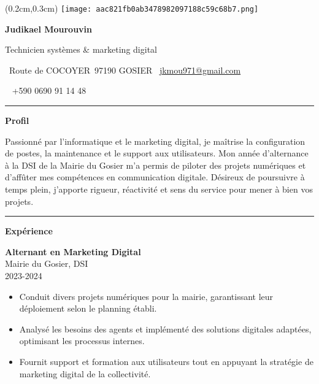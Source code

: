 \documentclass[a4paper]{article}
\renewcommand{\colorbox}[2]{#2}%
\newcommand{\fullrule}{\hspace{-1.5cm}\rule{\paperwidth}{0.4pt}}
\newcommand{\cvsection}[1]{%
  \vspace{6pt}\textbf{\Large #1}\par\vspace{2pt}}
\begin{document}
\color{white}
\begin{textblock*}{4cm}(0.2cm,0.3cm)
  \texttt{[image: aac821fb0ab3478982097188c59c68b7.png]}
\end{textblock*}

\begin{center}
  {\fontsize{44pt}{24pt}\selectfont\bfseries Judikael Mourouvin}

  \bigskip
  {\Large Technicien systèmes \& marketing digital}

  \bigskip\bigskip
  \faMapMarker~Route de COCOYER\ 97190 GOSIER
  \quad\faEnvelope~\href{mailto:jkmou971@gmail.com}{jkmou971@gmail.com}

  \bigskip
  \faPhone~ +590 0690 91 14 48
  \quad \faLinkedin\ \href{}{}
 

  \vspace{-0.3cm}
  \fullrule
\end{center}

\cvsection{Profil}
Passionné par l’informatique et le marketing digital, je maîtrise la configuration de postes, la maintenance et le support aux utilisateurs. Mon année d’alternance à la DSI de la Mairie du Gosier m’a permis de piloter des projets numériques et d’affûter mes compétences en communication digitale. Désireux de poursuivre à temps plein, j’apporte rigueur, réactivité et sens du service pour mener à bien vos projets.

\medskip\fullrule

\cvsection{Expérience}
\hspace*{1.3cm}%

\colorbox{maincolor}{%
  \begin{minipage}{\linewidth}
    \textbf{Alternant en Marketing Digital} \\ Mairie du Gosier, DSI \\ 2023-2024
    \begin{itemize}
      \item Conduit divers projets numériques pour la mairie, garantissant leur déploiement selon le planning établi. \item Analysé les besoins des agents et implémenté des solutions digitales adaptées, optimisant les processus internes. \item Fournit support et formation aux utilisateurs tout en appuyant la stratégie de marketing digital de la collectivité.
    \end{itemize}
  \end{minipage}}
\end{document}
